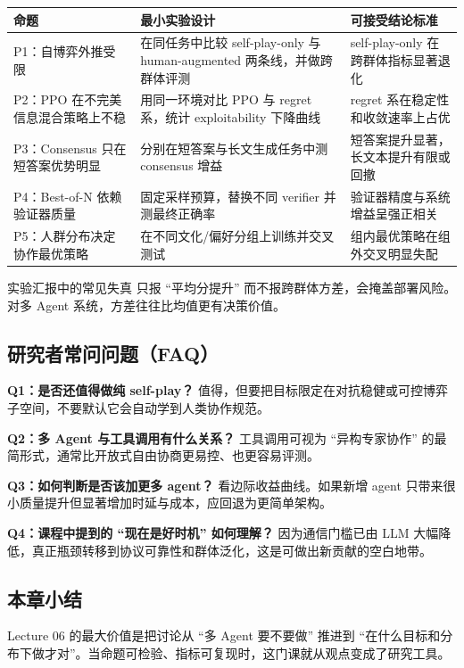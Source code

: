 \begin{longtable}{p{3.0cm}p{4.6cm}p{4.9cm}}
\toprule
\textbf{命题} & \textbf{最小实验设计} & \textbf{可接受结论标准} \\
\midrule
P1：自博弈外推受限 & 在同任务中比较 self-play-only 与 human-augmented 两条线，并做跨群体评测 & self-play-only 在跨群体指标显著退化 \\
P2：PPO 在不完美信息混合策略上不稳 & 用同一环境对比 PPO 与 regret 系，统计 exploitability 下降曲线 & regret 系在稳定性和收敛速率上占优 \\
P3：Consensus 只在短答案优势明显 & 分别在短答案与长文生成任务中测 consensus 增益 & 短答案提升显著，长文本提升有限或回撤 \\
P4：Best-of-N 依赖验证器质量 & 固定采样预算，替换不同 verifier 并测最终正确率 & 验证器精度与系统增益呈强正相关 \\
P5：人群分布决定协作最优策略 & 在不同文化/偏好分组上训练并交叉测试 & 组内最优策略在组外交叉明显失配 \\
\bottomrule
\end{longtable}

\begin{warningbox}{实验汇报中的常见失真}
只报 ``平均分提升'' 而不报跨群体方差，会掩盖部署风险。对多 Agent 系统，方差往往比均值更有决策价值。
\end{warningbox}

\subsection{研究者常问问题（FAQ）}
\textbf{Q1：是否还值得做纯 self-play？}
值得，但要把目标限定在对抗稳健或可控博弈子空间，不要默认它会自动学到人类协作规范。

\textbf{Q2：多 Agent 与工具调用有什么关系？}
工具调用可视为 ``异构专家协作'' 的最简形式，通常比开放式自由协商更易控、也更容易评测。

\textbf{Q3：如何判断是否该加更多 agent？}
看边际收益曲线。如果新增 agent 只带来很小质量提升但显著增加时延与成本，应回退为更简单架构。

\textbf{Q4：课程中提到的 ``现在是好时机'' 如何理解？}
因为通信门槛已由 LLM 大幅降低，真正瓶颈转移到协议可靠性和群体泛化，这是可做出新贡献的空白地带。

\subsection{本章小结}
Lecture 06 的最大价值是把讨论从 ``多 Agent 要不要做'' 推进到 ``在什么目标和分布下做才对''。当命题可检验、指标可复现时，这门课就从观点变成了研究工具。

